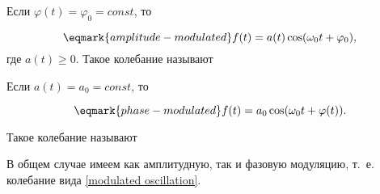 Если $\varphi(t)=\varphi_0=const$, то

\begin{equation}
    \eqmark{amplitude-modulated}
    f(t)=a(t)\cos(\omega_0t+\varphi_0),
\end{equation}
где $a(t)\ge0$. Такое колебание называют 

Если $a(t)=a_0=const$, то

\begin{equation}
    \eqmark{phase-modulated}
    f(t)=a_0 \cos(\omega_0t+\varphi(t)).
\end{equation}

Такое колебание называют 

В общем случае имеем как амплитудную, так и фазовую модуляцию, т.~е. колебание
вида \eqref{modulated oscillation}.







